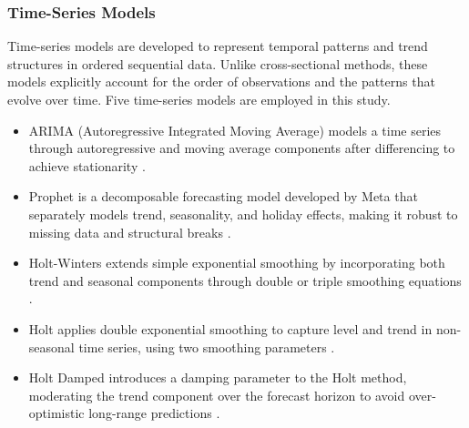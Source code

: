 \documentclass[final, 9pt, twocolumn]{saucis}
\begin{document}
\subsubsection{Time-Series Models}

Time-series models are developed to represent temporal patterns and trend structures in ordered sequential data. Unlike cross-sectional methods, these models explicitly account for the order of observations and the patterns that evolve over time. Five time-series models are employed in this study.

\begin{itemize}
    \item ARIMA (Autoregressive Integrated Moving Average) 
    models a time series through autoregressive and moving average 
    components after differencing to achieve stationarity 
    \cite{method13}.

    \item Prophet is a decomposable forecasting model 
    developed by Meta that separately models trend, seasonality, 
    and holiday effects, making it robust to missing data and 
    structural breaks \cite{method13}.

    \item Holt-Winters extends simple exponential smoothing 
    by incorporating both trend and seasonal components through 
    double or triple smoothing equations \cite{method14}.

    \item Holt applies double exponential smoothing to 
    capture level and trend in non-seasonal time series, using 
    two smoothing parameters \cite{method14}.

    \item Holt Damped introduces a damping parameter to 
    the Holt method, moderating the trend component over the 
    forecast horizon to avoid over-optimistic long-range predictions 
    \cite{method14}.
\end{itemize}
\end{document}
